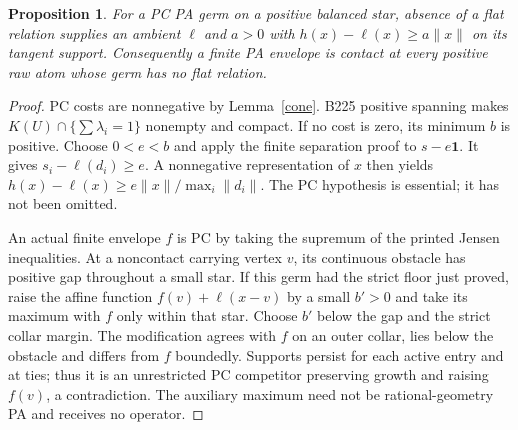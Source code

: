 \documentclass[11pt]{article}
\newtheorem{proposition}[theorem]{Proposition}
\begin{document}
\begin{proposition}\label{floor}
For a PC PA germ on a positive balanced star, absence of a flat
relation supplies an ambient $\ell$ and $a>0$ with
$h(x)-\ell(x)\geq a\|x\|$ on its tangent support. Consequently
a finite PA envelope is contact at every positive raw atom
whose germ has no flat relation.
\end{proposition}
\begin{proof}
PC costs are nonnegative by Lemma~\ref{cone}. B225 positive spanning
makes $K(U)\cap\{\sum\lambda_i=1\}$ nonempty and compact.
If no cost is zero, its minimum $b$ is positive. Choose
$0<e<b$ and apply the finite separation proof to $s-e\mathbf1$.
It gives $s_i-\ell(d_i)\geq e$. A nonnegative representation of
$x$ then yields $h(x)-\ell(x)\geq e\|x\|/\max_i\|d_i\|$.
The PC hypothesis is essential; it has not been omitted.

An actual finite envelope $f$ is PC by taking the supremum of
the printed Jensen inequalities. At a noncontact carrying vertex
$v$, its continuous obstacle has positive gap throughout a small
star. If this germ had the strict floor just proved, raise the
affine function $f(v)+\ell(x-v)$ by a small $b'>0$ and take its
maximum with $f$ only within that star. Choose $b'$ below the
gap and the strict collar margin. The modification agrees with
$f$ on an outer collar, lies below the obstacle and differs from
$f$ boundedly. Supports persist for each active entry and at
ties; thus it is an unrestricted PC competitor preserving growth
and raising $f(v)$, a contradiction. The auxiliary maximum
need not be rational-geometry PA and receives no operator.
\end{proof}
\end{document}

